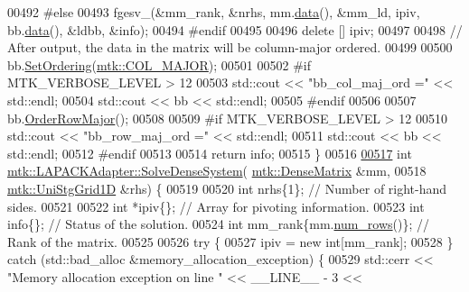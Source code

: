 \begin{DoxyCode}
00492 \textcolor{preprocessor}{  #else}
00493   fgesv\_(&mm\_rank, &nrhs, mm.\hyperlink{classmtk_1_1DenseMatrix_a0c33b8a9e01d157c61ddbdf807c25d84}{data}(), &mm\_ld, ipiv, bb.\hyperlink{classmtk_1_1DenseMatrix_a0c33b8a9e01d157c61ddbdf807c25d84}{data}(), &ldbb, &info);
00494 \textcolor{preprocessor}{  #endif}
00495 
00496   \textcolor{keyword}{delete} [] ipiv;
00497 
00498   \textcolor{comment}{// After output, the data in the matrix will be column-major ordered.}
00499 
00500   bb.\hyperlink{classmtk_1_1DenseMatrix_a178e63f365cf8c547dc5020c60357f5e}{SetOrdering}(\hyperlink{namespacemtk_ga622801bd9f912d0f976c3e383f5f581ca7c11989c132253fb76b8f6b1314f7e13}{mtk::COL\_MAJOR});
00501 
00502 \textcolor{preprocessor}{  #if MTK\_VERBOSE\_LEVEL > 12}
00503   std::cout << \textcolor{stringliteral}{"bb\_col\_maj\_ord ="} << std::endl;
00504   std::cout << bb << std::endl;
00505 \textcolor{preprocessor}{  #endif}
00506 
00507   bb.\hyperlink{classmtk_1_1DenseMatrix_ac2949efba3e8278335d45418c85433e4}{OrderRowMajor}();
00508 
00509 \textcolor{preprocessor}{  #if MTK\_VERBOSE\_LEVEL > 12}
00510   std::cout << \textcolor{stringliteral}{"bb\_row\_maj\_ord ="} << std::endl;
00511   std::cout << bb << std::endl;
00512 \textcolor{preprocessor}{  #endif}
00513 
00514   \textcolor{keywordflow}{return} info;
00515 \}
00516 
\hypertarget{mtk__lapack__adapter_8cc_source_l00517}{}\hyperlink{classmtk_1_1LAPACKAdapter_ac38be1e30a2456b2a14c8a81f47c4ba1}{00517} \textcolor{keywordtype}{int} \hyperlink{classmtk_1_1LAPACKAdapter_a7428bccf74fd4a4af68fb7233846da22}{mtk::LAPACKAdapter::SolveDenseSystem}(
      \hyperlink{classmtk_1_1DenseMatrix}{mtk::DenseMatrix} &mm,
00518                                          \hyperlink{classmtk_1_1UniStgGrid1D}{mtk::UniStgGrid1D} &rhs) \{
00519 
00520   \textcolor{keywordtype}{int} nrhs\{1\};  \textcolor{comment}{// Number of right-hand sides.}
00521 
00522   \textcolor{keywordtype}{int} *ipiv\{\};                \textcolor{comment}{// Array for pivoting information.}
00523   \textcolor{keywordtype}{int} info\{\};                 \textcolor{comment}{// Status of the solution.}
00524   \textcolor{keywordtype}{int} mm\_rank\{mm.\hyperlink{classmtk_1_1DenseMatrix_a53f3afb3b6a8d21854458aaa9663cc74}{num\_rows}()\}; \textcolor{comment}{// Rank of the matrix.}
00525 
00526   \textcolor{keywordflow}{try} \{
00527     ipiv = \textcolor{keyword}{new} \textcolor{keywordtype}{int}[mm\_rank];
00528   \} \textcolor{keywordflow}{catch} (std::bad\_alloc &memory\_allocation\_exception) \{
00529     std::cerr << \textcolor{stringliteral}{"Memory allocation exception on line "} << \_\_LINE\_\_ - 3 <<

\end{DoxyCode}
